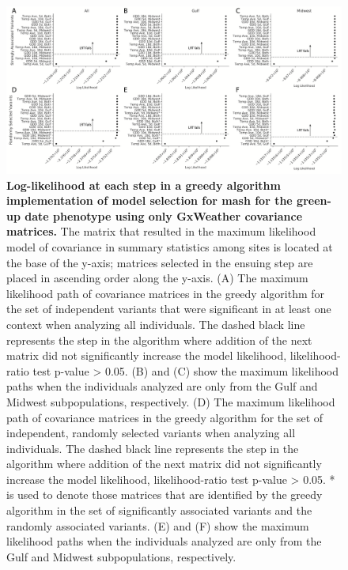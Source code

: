 \documentclass[
  letterpaper,
  DIV=11,
  numbers=noendperiod]{scrartcl}
\begin{document}
\begin{figure}[H]

{\centering \includegraphics{images/RR_Figure1.png}

}

\caption{\textbf{Log-likelihood at each step in a greedy algorithm
implementation of model selection for mash for the green-up date
phenotype using only GxWeather covariance matrices.} The matrix that
resulted in the maximum likelihood model of covariance in summary
statistics among sites is located at the base of the y-axis; matrices
selected in the ensuing step are placed in ascending order along the
y-axis. (A) The maximum likelihood path of covariance matrices in the
greedy algorithm for the set of independent variants that were
significant in at least one context when analyzing all individuals. The
dashed black line represents the step in the algorithm where addition of
the next matrix did not significantly increase the model likelihood,
likelihood-ratio test p-value \textgreater{} 0.05. (B) and (C) show the
maximum likelihood paths when the individuals analyzed are only from the
Gulf and Midwest subpopulations, respectively. (D) The maximum
likelihood path of covariance matrices in the greedy algorithm for the
set of independent, randomly selected variants when analyzing all
individuals. The dashed black line represents the step in the algorithm
where addition of the next matrix did not significantly increase the
model likelihood, likelihood-ratio test p-value \textgreater{} 0.05. *
is used to denote those matrices that are identified by the greedy
algorithm in the set of significantly associated variants and the
randomly associated variants. (E) and (F) show the maximum likelihood
paths when the individuals analyzed are only from the Gulf and Midwest
subpopulations, respectively.}

\end{figure}%
\end{document}
